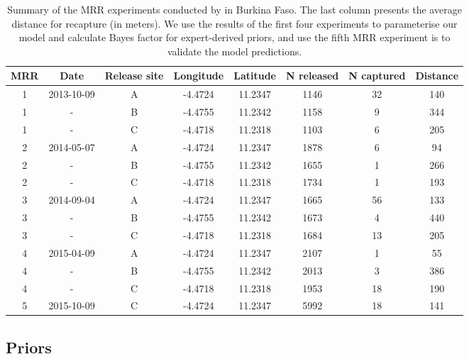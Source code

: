 \documentclass[]{bmcart}
\begin{document}
\begin{table}[ht]
\centering
\begingroup\small
\begin{tabular}{|cccccccc|}
\hline
MRR & Date & Release site & Longitude & Latitude & N released & N captured & Distance\\ 
\hline
1 & 2013-10-09 & A & -4.4724 & 11.2347 & 1146 & 32 & 140\\ 
1 & - & B & -4.4755 & 11.2342 & 1158 & 9 & 344\\ 
1 & - & C & -4.4718 & 11.2318 & 1103 & 6 & 205\\ 
2 & 2014-05-07 & A & -4.4724 & 11.2347 & 1878 & 6 & 94\\ 
2 & - & B & -4.4755 & 11.2342 & 1655 & 1 & 266\\ 
2 & - & C & -4.4718 & 11.2318 & 1734 & 1 & 193\\ 
3 & 2014-09-04 & A & -4.4724 & 11.2347 & 1665 & 56 & 133\\ 
3 & - & B & -4.4755 & 11.2342 & 1673 & 4 & 440\\ 
3 & - & C & -4.4718 & 11.2318 & 1684 & 13 & 205\\ 
4 & 2015-04-09 & A & -4.4724 & 11.2347 & 2107 & 1 & 55\\ 
4 & - & B & -4.4755 & 11.2342 & 2013 & 3 & 386\\ 
4 & - & C & -4.4718 & 11.2318 & 1953 & 18 & 190\\ 
5 & 2015-10-09 & C & -4.4724 & 11.2347 & 5992 & 18 & 141\\ 
\hline
\end{tabular}
\endgroup
\caption{Summary of the MRR experiments conducted by \cite{Epopa2017} in Burkina Faso. The last column presents the average distance for recapture (in meters). We use the results of the first four experiments to parameterise our model and calculate Bayes factor for expert-derived priors, and use the fifth MRR experiment is to validate the model predictions.} 
\label{tab:relLoc}
\end{table}

\subsection{Priors}
\end{document}
